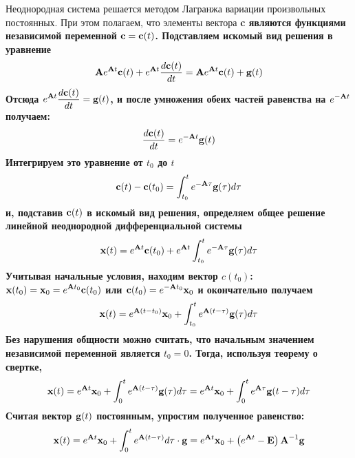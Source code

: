 Неоднородная система решается методом Лагранжа вариации произвольных постоянных. При этом полагаем, что элементы вектора
\bf{c} являются функциями независимой переменной $\bf{c} = \bf{c}(t)$. Подставляем искомый вид решения в уравнение
\begin{equation*}
    \bf{A}e^{\bf{A}t}\bf{c}(t) + e^{\bf{A}t}\frac{d\bf{c}(t)}{dt} = \bf{A} e^{\bf{A}t}\bf{c}(t) + \bf{g}(t)
\end{equation*}
Отсюда $\displaystyle e^{\bf{A}t}\frac{d\bf{c}(t)}{dt} = \bf{g}(t)$, и после умножения обеих частей равенства на
$\displaystyle e^{-\bf{A}t}$ получаем:
\begin{equation*}
    \frac{d\bf{c}(t)}{dt} = e^{-\bf{A}t}\bf{g}(t)
\end{equation*}
Интегрируем это уравнение от $t_0$ до $t$
\begin{equation*}
    \bf{c}(t) - \bf{c}(t_0) = \int_{t_0}^{t} e^{-\bf{A}\tau}\bf{g}(\tau)d\tau
\end{equation*}
и, подставив $\bf{c}(t)$ в искомый вид решения, определяем общее решение линейной неоднородной дифференциальной системы
\begin{equation*}
    \bf{x}(t) = e^{\bf{A}t}\bf{c}(t_0) + e^{\bf{A}t}\int_{t_0}^{t}e^{-\bf{A}\tau}\bf{g}(\tau)d\tau
\end{equation*}
Учитывая начальные условия, находим вектор $\displaystyle c(t_0)$: $\displaystyle \bf{x}(t_0) = \bf{x}_0 = e^{\bf{A}t_0}\bf{c}(t_0)$
или $\displaystyle \bf{c}(t_0) = e^{-\bf{A}t_0}\bf{x}_0$ и окончательно получаем
\begin{equation*}
    \bf{x}(t) = e^{\bf{A}(t - t_0)}\bf{x}_0 + \int_{t_0}^{t} e^{\bf{A}(t - \tau)}\bf{g}(\tau)d\tau
\end{equation*}
Без нарушения общности можно считать, что начальным значением независимой переменной является $\displaystyle t_0 = 0$.
Тогда, используя теорему о свертке,
\begin{equation}
    \bf{x}(t) = e^{\bf{A}t}\bf{x}_0 + \int_{0}^{t} e^{\bf{A}(t - \tau)}\bf{g}(\tau)d\tau = e^{\bf{A}t}\bf{x}_0 + \int_{0}^{t} e^{\bf{A}\tau}\bf{g}(t - \tau)d\tau \label{eq:diffeqsol}
\end{equation}
Считая вектор $\bf{g}(t)$ постоянным, упростим полученное равенство:
\begin{equation*}
    \bf{x}(t) = e^{\bf{A}t}\bf{x}_0 + \int_{0}^{t} e^{\bf{A}(t - \tau)}d\tau \cdot \bf{g} = e^{\bf{A}t}\bf{x}_0 + \left( e^{\bf{A}t} - \bf{E} \right)\bf{A}^{-1}\bf{g}
\end{equation*}

